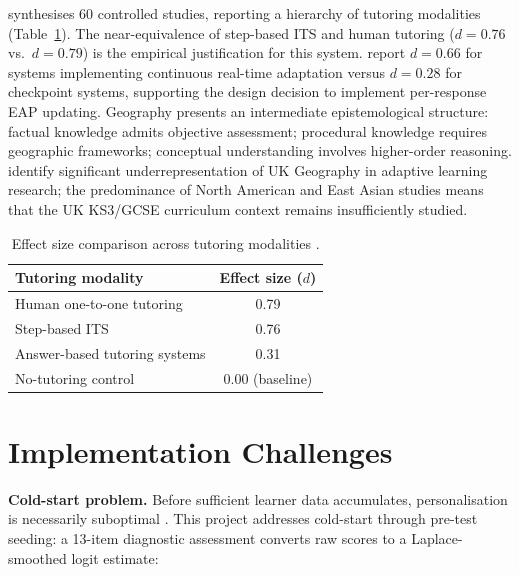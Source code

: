 \textcite{vanlehn2011} synthesises 60 controlled studies, reporting a
hierarchy of tutoring modalities (Table~\ref{tab:effect_sizes}). The
near-equivalence of step-based ITS and human tutoring ($d = 0.76$ vs.\
$d = 0.79$) is the empirical justification for this system. \textcite{kulik2016}
report $d = 0.66$ for systems implementing continuous real-time adaptation
versus $d = 0.28$ for checkpoint systems, supporting the design decision to
implement per-response EAP updating. Geography presents an intermediate
epistemological structure: factual knowledge admits objective assessment;
procedural knowledge requires geographic frameworks; conceptual understanding
involves higher-order reasoning. \textcite{bednarz2013} identify significant
underrepresentation of UK Geography in adaptive learning research; the
predominance of North American and East Asian studies \parencite{matos2025}
means that the UK KS3/GCSE curriculum context remains insufficiently studied.

\begin{table}[H]
\centering
\caption{Effect size comparison across tutoring modalities \parencite{vanlehn2011}.}
\label{tab:effect_sizes}
\renewcommand{\arraystretch}{1.3}
\begin{tabular}{lc}
\toprule
\textbf{Tutoring modality} & \textbf{Effect size ($d$)} \\
\midrule
Human one-to-one tutoring & 0.79 \\
Step-based ITS & 0.76 \\
Answer-based tutoring systems & 0.31 \\
No-tutoring control & 0.00 (baseline) \\
\bottomrule
\end{tabular}
\end{table}

\section{Implementation Challenges}
\label{sec:lr_challenges}

\textbf{Cold-start problem.} Before sufficient learner data accumulates,
personalisation is necessarily suboptimal \parencite{matos2025}. This project
addresses cold-start through pre-test seeding: a 13-item diagnostic assessment
converts raw scores to a Laplace-smoothed logit estimate:

